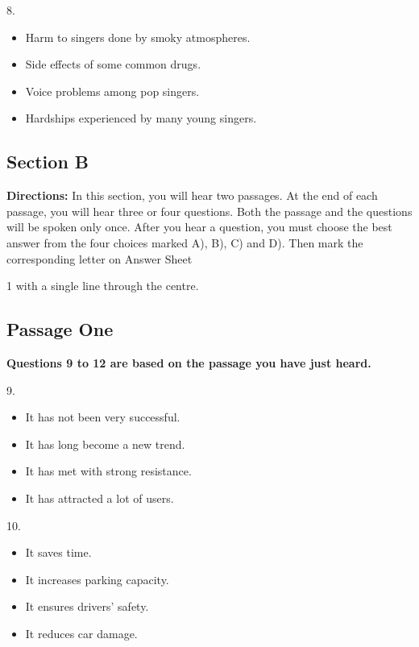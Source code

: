 \documentclass[UTF8,11pt]{ctexart}
\begin{document}
8.


\begin{itemize}[leftmargin=2em,itemsep=.2em,topsep=.4em]\item[A.] Harm to singers done by smoky atmospheres.
\item[B.] Side effects of some common drugs.
\item[C.] Voice problems among pop singers.
\item[D.] Hardships experienced by many young singers.
\end{itemize}

\subsection*{\textbf{Section B}}


\textbf{Directions:} In this section, you will hear two passages. At the end of each passage, you will hear three or four questions. Both the passage and the questions will be spoken only once. After you hear a question, you must choose the best answer from the four choices marked A), B), C) and D). Then mark the corresponding letter on Answer Sheet


1 with a single line through the centre.


\subsection*{\textbf{Passage One}}


\textbf{Questions 9 to 12 are based on the passage you have just heard.}


9.


\begin{itemize}[leftmargin=2em,itemsep=.2em,topsep=.4em]\item[A.] It has not been very successful.
\item[B.] It has long become a new trend.
\item[C.] It has met with strong resistance.
\item[D.] It has attracted a lot of users.
\end{itemize}

10.


\begin{itemize}[leftmargin=2em,itemsep=.2em,topsep=.4em]\item[A.] It saves time.
\item[B.] It increases parking capacity.
\item[C.] It ensures drivers' safety.
\item[D.] It reduces car damage.
\end{itemize}
\end{document}
